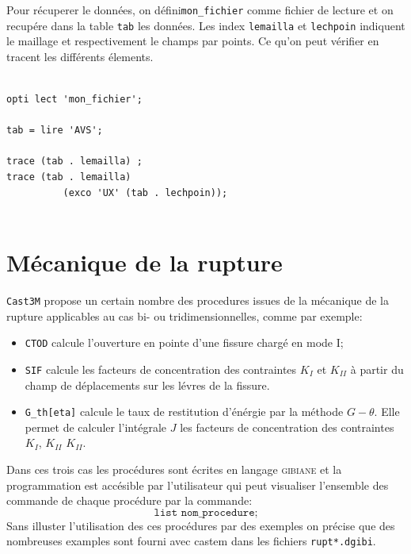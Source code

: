 \begin{castemcom}
Pour récuperer le données, on défini\texttt{mon\_fichier}
comme fichier de lecture et on recupére dans la table
\texttt{tab} les données. Les index \texttt{lemailla} et \texttt{lechpoin}
indiquent le maillage et respectivement le champs par points. Ce qu'on peut 
vérifier en tracent les différents élements.
\end{castemcom}
\begin{castemlines}
\begin{verbatim}

opti lect 'mon_fichier';
   
tab = lire 'AVS'; 
      
trace (tab . lemailla) ;
trace (tab . lemailla) 
          (exco 'UX' (tab . lechpoin));
   
\end{verbatim}
\end{castemlines}

\section{Mécanique de la rupture}

\texttt{Cast3M} propose un certain nombre des procedures issues de la 
mécanique de la rupture applicables au cas bi- ou tridimensionnelles, 
comme par exemple: 
\begin{itemize}

 \item{\texttt{CTOD}} calcule l'ouverture en pointe d'une fissure 
 chargé en mode I;  

 \item{\texttt{SIF}} calcule les facteurs de concentration des contraintes 
 $K_{I}$ et $K_{II}$ à partir du champ de déplacements sur les lévres de la 
 fissure. 

 \item{\texttt{G\_th[eta]}} calcule le taux de restitution d'énérgie par la 
  méthode $G - \theta$. Elle permet de calculer l'intégrale $J$ 
  les facteurs de concentration des contraintes 
 $K_{I}$, $K_{II}$ $K_{II}$. 
 
\end{itemize} 
Dans ces trois cas les procédures sont écrites en langage \textsc{gibiane} 
et la programmation est accésible par l'utilisateur qui peut visualiser 
l'ensemble des commande de chaque procédure par la commande:
$$
\texttt{list nom\_procedure;}
$$
Sans illuster l'utilisation des ces procédures par des exemples on précise 
que des nombreuses examples sont fourni avec castem dans les fichiers 
\texttt{rupt*.dgibi}.


